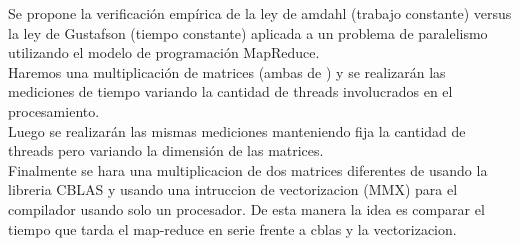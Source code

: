 Se propone la verificación empírica de la ley de amdahl  (trabajo constante)
versus la ley de  Gustafson (tiempo constante) aplicada a un problema de
paralelismo utilizando el modelo de programación MapReduce.\\
Haremos una multiplicación de matrices (ambas de ) y se realizarán las
mediciones de tiempo variando la cantidad de threads involucrados en el
procesamiento.\\
Luego se realizarán las mismas mediciones manteniendo fija la cantidad de
threads pero variando la dimensión de las matrices.\\
Finalmente se hara una multiplicacion de dos matrices diferentes de 
usando la libreria CBLAS y usando una intruccion de vectorizacion (MMX) para
el compilador usando solo un procesador. De esta manera la idea es comparar
el tiempo que tarda el map-reduce en serie frente a cblas y la vectorizacion.
